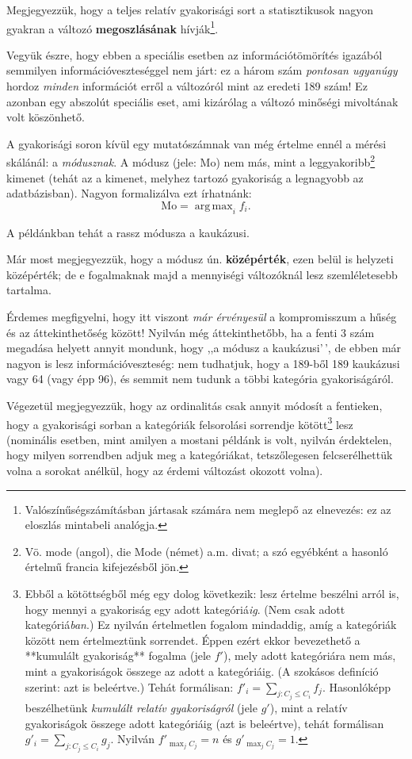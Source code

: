 \documentclass[
]{book}
\begin{document}
Megjegyezzük, hogy a teljes relatív gyakorisági sort a statisztikusok nagyon gyakran a változó \textbf{megoszlásának} hívják\footnote{Valószínűségszámításban jártasak számára nem meglepő az elnevezés: ez az eloszlás mintabeli analógja.}.

Vegyük észre, hogy ebben a speciális esetben az információtömörítés igazából semmilyen információveszteséggel nem járt: ez a három szám \emph{pontosan ugyanúgy} hordoz \emph{minden} információt erről a változóról mint az eredeti 189 szám! Ez azonban egy abszolút speciális eset, ami kizárólag a változó minőségi mivoltának volt köszönhető.

A gyakorisági soron kívül egy mutatószámnak van még értelme ennél a mérési skálánál: a \emph{módusznak}. A módusz (jele: \(\mathrm{Mo}\)) nem más, mint a leggyakoribb\footnote{Vö. mode (angol), die Mode (német) a.m. divat; a szó egyébként a hasonló értelmű francia kifejezésből jön.} kimenet (tehát az a kimenet, melyhez tartozó gyakoriság a legnagyobb az adatbázisban). Nagyon formalizálva ezt írhatnánk:
\[
    \mathrm{Mo}=\mathop{\mathrm{arg\,max}}_i f_i.
\]

A példánkban tehát a rassz módusza a kaukázusi.

Már most megjegyezzük, hogy a módusz ún. \textbf{középérték}, ezen belül is helyzeti középérték; de e fogalmaknak majd a mennyiségi változóknál lesz szemléletesebb tartalma.

Érdemes megfigyelni, hogy itt viszont \emph{már érvényesül} a kompromisszum a hűség és az áttekinthetőség között! Nyilván még áttekinthetőbb, ha a fenti 3 szám megadása helyett annyit mondunk, hogy ,,a módusz a kaukázusi'\,', de ebben már nagyon is lesz információveszteség: nem tudhatjuk, hogy a 189-ből 189 kaukázusi vagy 64 (vagy épp 96), és semmit nem tudunk a többi kategória gyakoriságáról.

Végezetül megjegyezzük, hogy az ordinalitás csak annyit módosít a fentieken, hogy a gyakorisági sorban a kategóriák felsorolási sorrendje kötött\footnote{Ebből a kötöttségből még egy dolog következik: lesz értelme beszélni arról is, hogy mennyi a gyakoriság egy adott kategóriá\emph{ig}. (Nem csak adott kategóriá\emph{ban}.) Ez nyilván értelmetlen fogalom mindaddig, amíg a kategóriák között nem értelmeztünk sorrendet. Éppen ezért ekkor bevezethető a **kumulált gyakoriság** fogalma (jele $f'$), mely adott kategóriára nem más, mint a gyakoriságok összege az adott a kategóriáig. (A szokásos definíció szerint: azt is beleértve.) Tehát formálisan: $f'_i=\sum_{j:C_j\leq C_i} f_j$. Hasonlóképp beszélhetünk \emph{kumulált relatív gyakoriságról} (jele $g'$), mint a relatív gyakoriságok összege adott kategóriáig (azt is beleértve), tehát formálisan $g'_i=\sum_{j:C_j\leq C_i} g_j$. Nyilván $f'_{\max_j C_j}=n$ és $g'_{\max_j C_j}=1$.} lesz (nominális esetben, mint amilyen a mostani példánk is volt, nyilván érdektelen, hogy milyen sorrendben adjuk meg a kategóriákat, tetszőlegesen felcserélhettük volna a sorokat anélkül, hogy az érdemi változást okozott volna).
\end{document}
